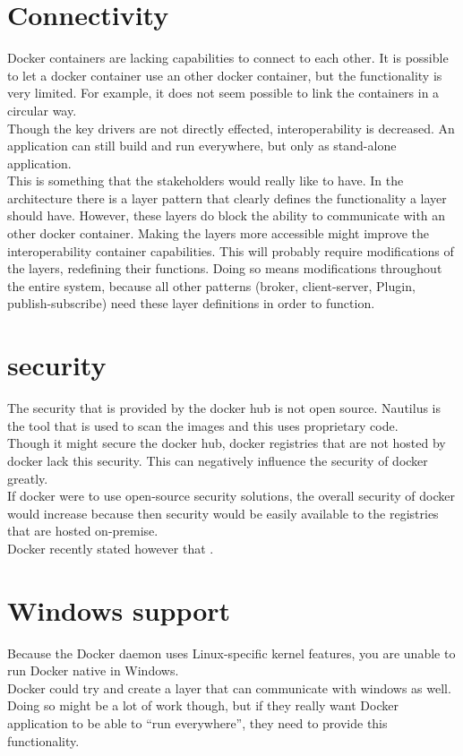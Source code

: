 \section{Connectivity}
Docker containers are lacking capabilities to connect to each other. It is possible to let a docker container use an other docker container, but the functionality is very limited. For example, it does not seem possible to link the containers in a circular way.\\
Though the key drivers are not directly effected, interoperability is decreased. An application can still build and run everywhere, but only as stand-alone application.\\
This is something that the stakeholders would really like to have. In the architecture there is a layer pattern that clearly defines the functionality a layer should have. However, these layers do block the ability to communicate with an other docker container. Making the layers more accessible might improve the interoperability container capabilities. This will probably require modifications of the layers, redefining their functions. Doing so means modifications throughout the entire system, because all other patterns (broker, client-server, Plugin, publish-subscribe) need these layer definitions in order to function.

\section{security}
The security that is provided by the docker hub is not open source. Nautilus is the tool that is used to scan the images and this uses proprietary code.\\ 
Though it might secure the docker hub, docker registries that are not hosted by docker lack this security. This can negatively influence the security of docker greatly.\\
If docker were to use open-source security solutions, the overall security of docker would increase because then security would be easily available to the registries that are hosted on-premise.\\
Docker recently stated however that .

\section{Windows support}
Because the Docker daemon uses Linux-specific kernel features, you are unable to run Docker native in Windows. \\
Docker could try and create a layer that can communicate with windows as well. Doing so might be a lot of work though, but if they really want Docker application to be able to ``run everywhere'', they need to provide this functionality.
